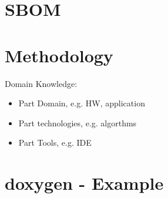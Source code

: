 \documentclass[12pt,a4paper]{scrbook}
\begin{document}
\chapter{SBOM}

\chapter{Methodology}

Domain Knowledge:

\begin{itemize}
    \item Part Domain, e.g. HW, application
    \item Part technologies, e.g. algorthms
    \item Part Tools, e.g. IDE
\end{itemize}


\chapter{doxygen - Example}

\cleardoublepage
{}
\printbibliography


\cleardoublepage

\printindex
\end{document}

